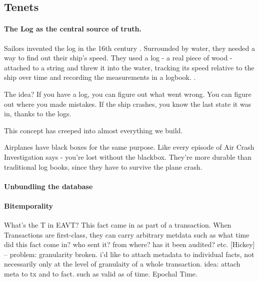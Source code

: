 \subsection{Tenets}\label{sec:tenets}

\paragraph{The Log as the central source of truth.}

Sailors invented the log in the 16th century \cite{may1973historylog}. Surrounded by water, they needed a way to find out their ship's speed. They used a log - a real piece of wood - attached to a string and threw it into the water, tracking its speed relative to the ship over time and recording the measurements in a logbook. \cite{kakkar19log}.



The idea? If you have a log, you can figure out what went wrong. You can figure out where you made mistakes. If the ship crashes, you know the last state it was in, thanks to the logs.

This concept has creeped into almost everything we build.

Airplanes have black boxes for the same purpose. Like every episode of Air Crash Investigation says - you’re lost without the blackbox. They’re more durable than traditional log books, since they have to survive the plane crash.



\paragraph{Unbundling the database}






\paragraph{Bitemporality}



What's the T in EAVT? This fact came in as part of a transaction. When Transactions are first-class, they can carry arbitrary metdata such as what time did this fact come in? who sent it? from where? has it been audited? etc. [Hickey]
-- problem: granularity broken. i'd like to attach metadata to individual facts, not necessarily only at the level of granulaity of a whole transaction. idea: attach meta to tx and to fact. such as valid as of time.
Epochal Time.

